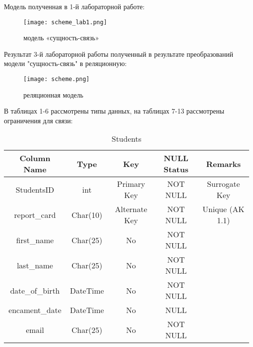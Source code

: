 \documentclass[a4paper, 14pt]{extarticle}
\begin{document}
Модель полученная в 1-й лабораторной работе:

\begin{figure}[H]
	\centering
	\texttt{[image: scheme\_lab1.png]}
\caption{модель «сущность-связь»}
\label{fig:scheme}
\end{figure}

Результат 3-й лабораторной работы полученный в результате преобразований модели "сущность-связь" в реляционную:

\begin{figure}[H]
	\centering
	\texttt{[image: scheme.png]}
\caption{реляционная модель}
\label{fig:scheme}
\end{figure}
 
В таблицах 1-6 рассмотрены типы данных, на таблицах 7-13 рассмотрены ограничения для связи:

\begin{table}[H]
\centering
\captionsetup{singlelinecheck=false, justification=raggedright}
\caption{Students}
    \begin{tabular}
        {|c|c|c|c|c|}
        \hline
        Column Name & Type & Key & NULL Status  & Remarks \\
        \hline
        StudentsID & int & Primary Key & NOT NULL & Surrogate Key \\
        \hline
        report\_card & Char(10) & Alternate Key & NOT NULL & Unique (AK 1.1) \\
        \hline
        first\_name & Char(25) & No & NOT NULL &  \\
        \hline
        last\_name & Char(25) & No & NOT NULL &  \\
        \hline
        date\_of\_birth & DateTime & No & NOT NULL &  \\
        \hline
        encament\_date & DateTime & No & NULL &  \\
        \hline
        email & Char(25) & No & NOT NULL &  \\
    \hline
    \end{tabular}
\end{table}
\end{document}
